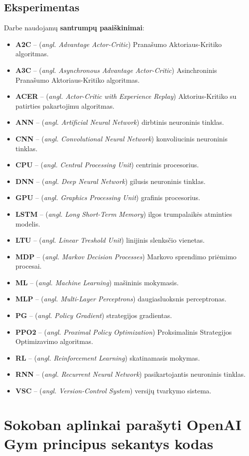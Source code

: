 \documentclass{VUMIFPSbakalaurinis}
\begin{document}
\subsection{Eksperimentas}

\printbibliography[heading=bibintoc] 

{
	Darbe naudojamų \textbf{santrumpų paaiškinimai}:
	\begin{itemize}
		\item \textbf{A2C} -- (\textit{angl. Advantage Actor-Critic}) Pranašumo Aktoriaus-Kritiko algoritmas.
		\item \textbf{A3C} -- (\textit{angl. Asynchronous Advantage Actor-Critic}) Asinchroninis Pranašumo Aktoriaus-Kritiko algoritmas.
		\item \textbf{ACER} -- (\textit{angl. Actor-Critic with Experience Replay}) Aktorius-Kritiko su patirties pakartojimu algoritmas.
		\item \textbf{ANN} -- (\textit{angl. Artificial Neural Network}) dirbtinis neuroninis tinklas.
		\item \textbf{CNN} -- (\textit{angl. Convolutional Neural Network}) konvoliucinis neuroninis tinklas.
		\item \textbf{CPU} -- (\textit{angl. Central Processing Unit}) centrinis procesorius.
		\item \textbf{DNN} -- (\textit{angl. Deep Neural Network}) gilusis neuroninis tinklas.
		\item \textbf{GPU} -- (\textit{angl. Graphics Processing Unit}) grafinis procesorius.
		\item \textbf{LSTM} -- (\textit{angl. Long Short-Term Memory}) ilgos trumpalaikės atminties modelis.
		\item \textbf{LTU} -- (\textit{angl. Linear Treshold Unit}) linijinis slenksčio vienetas.
		\item \textbf{MDP} -- (\textit{angl. Markov Decision Processes}) Markovo sprendimo priėmimo procesai.
		\item \textbf{ML} -- (\textit{angl. Machine Learning}) mašininis mokymasis.
		\item \textbf{MLP} -- (\textit{angl. Multi-Layer Perceptrons}) daugiasluoksnis perceptronas.
		\item \textbf{PG} -- (\textit{angl. Policy Gradient}) strategijos gradientas.
		\item \textbf{PPO2} -- (\textit{angl. Proximal Policy Optimization}) Proksimalinis Strategijos Optimizavimo algoritmas.
		\item \textbf{RL} -- (\textit{angl. Reinforcement Learning}) skatinamasis mokymas.
		\item \textbf{RNN} -- (\textit{angl. Recurrent Neural Network}) pasikartojantis neuroninis tinklas.
		\item \textbf{VSC} -- (\textit{angl. Version-Control System}) versijų tvarkymo sistema.
	\end{itemize}
}


\section{Sokoban aplinkai parašyti OpenAI Gym principus sekantys kodas}

\end{document}
